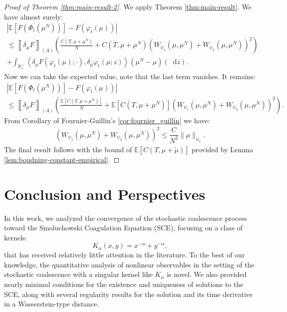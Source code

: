 \documentclass[11pt,a4paper]{article}
\newcommand{\RRP}{\mathbb{R}^+_*}
\newcommand{\A}{(A)}
\newcommand{\E}[1]{\mathbb{E}\left[#1\right]}
\newcommand{\dd}{\mathop{}\!\mathrm{d}}
\begin{document}
\begin{proof}[Proof of Theorem \ref{thm:main-result-2}]
    We apply Theorem \ref{thm:main-result}. We have almost surely:
    \begin{multline*}
        \left| \mathbb{E}\left[F\left(\Phi_t\left(\mu^N\right)\right)\right] - F\left(\varphi_t(\mu)\right) \right| \\
        \leq \left\llbracket \delta_\mu F \right\rrbracket_{\A} \left( \frac{C(T,\mu + \mu^N)}{N} + C(T,\mu + \mu^N)\left(W_{\psi_1}\left(\mu,\mu^N\right) + W_{\psi_2}\left(\mu,\mu^N\right) \right)^2\right) \\
        + \int_{\RRP} \left\langle \delta_\mu F\left(\varphi_t \left(\mu\right);\cdot \right), \delta_\mu \varphi_t\left(\mu;z \right) \right\rangle \left(\mu^N - \mu\right)(\dd z).
    \end{multline*}
    Now we can take the expected value, note that the last term vanishes. It remains:
    \begin{multline*}
         \left| \mathbb{E}\left[F\left(\Phi_t\left(\mu^N\right)\right)\right] - F\left(\varphi_t(\mu)\right) \right| \\
        \leq \left\llbracket \delta_\mu F \right\rrbracket_{\A} \left( \frac{\E{C(T,\mu + \mu^N)}}{N} + \E{C(T,\mu + \mu^N)}\left(W_{\psi_1}\left(\mu,\mu^N\right) + W_{\psi_2}\left(\mu,\mu^N\right) \right)^2\right).
    \end{multline*}
    From Corollary of Fournier-Guillin's \ref{cor:fournier_guillin} we have:
    \begin{align*}
        \left(W_{\psi_1}\left(\mu,\mu^N\right) + W_{\psi_2}\left(\mu,\mu^N\right) \right)^2 \leq \dfrac{C}{N^2} \|\mu\|_{\psi_5}.
    \end{align*}
    The final result follows with the bound of $\E{C(T,\mu + \tilde{\mu})}$ provided by Lemma \ref{lem:boudning-constant-empirical}.
\end{proof}

\section{Conclusion and Perspectives}

In this work, we analyzed the convergence of the stochastic coalescence process toward the Smoluchowski Coagulation Equation (SCE), focusing on a class of kernels: 
\[ K_\alpha(x,y) = x^{-\alpha} + y^{-\alpha},\]
that has received relatively little attention in the literature. To the best of our knowledge, the quantitative analysis of nonlinear observables in the setting of the stochastic coalescence with a singular kernel like $K_\alpha$ is novel. We also provided nearly minimal conditions for the existence and uniqueness of solutions to the SCE, along with several regularity results for the solution and its time derivative in a Wasserstein-type distance.
\end{document}
